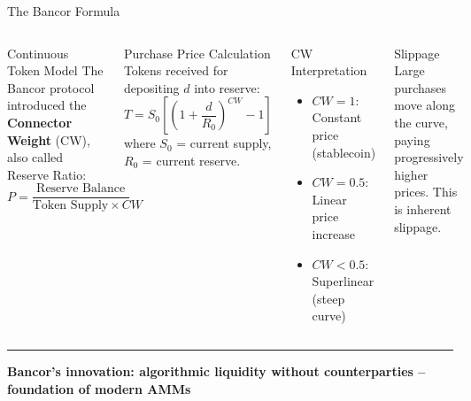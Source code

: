 \documentclass[8pt,aspectratio=169]{beamer}
\newcommand{\bottomnote}[1]{\vfill\vspace{-2mm}\textcolor{mllavender2}{\rule{\textwidth}{0.4pt}}\vspace{1mm}\footnotesize\textbf{#1}}
\begin{document}
\begin{frame}{The Bancor Formula}
\begin{columns}[T]
\begin{block}{Continuous Token Model}
\footnotesize
The Bancor protocol introduced the \textbf{Connector Weight} (CW), also called Reserve Ratio:
\[
P = \frac{\text{Reserve Balance}}{\text{Token Supply} \times CW}
\]
\end{block}
\vspace{1mm}
\begin{block}{Purchase Price Calculation}
\footnotesize
Tokens received for depositing $d$ into reserve:
\[
T = S_0 \left[\left(1 + \frac{d}{R_0}\right)^{CW} - 1\right]
\]
where $S_0$ = current supply, $R_0$ = current reserve.
\end{block}
\vspace{1mm}
\begin{exampleblock}{\footnotesize CW Interpretation}
\footnotesize
\begin{itemize}
  \item $CW = 1$: Constant price (stablecoin)
  \item $CW = 0.5$: Linear price increase
  \item $CW < 0.5$: Superlinear (steep curve)
\end{itemize}
\end{exampleblock}

\vspace{2mm}
\begin{alertblock}{\footnotesize Slippage}
\footnotesize
Large purchases move along the curve, paying progressively higher prices. This is inherent slippage.
\end{alertblock}
\end{columns}
\bottomnote{Bancor's innovation: algorithmic liquidity without counterparties -- foundation of modern AMMs}
\end{frame}
\end{document}
